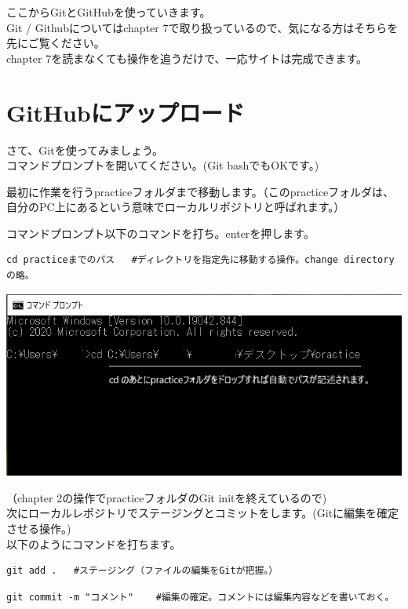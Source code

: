 \documentclass[
]{book}
\begin{document}
ここからGitとGitHubを使っていきます。\\
Git / Githubについてはchapter 7で取り扱っているので、気になる方はそちらを先にご覧ください。\\
chapter 7を読まなくても操作を追うだけで、一応サイトは完成できます。

\hypertarget{githubux306bux30a2ux30c3ux30d7ux30edux30fcux30c9}{%
\section{GitHubにアップロード}\label{githubux306bux30a2ux30c3ux30d7ux30edux30fcux30c9}}

さて、Gitを使ってみましょう。\\
コマンドプロンプトを開いてください。(Git bashでもOKです。)

最初に作業を行うpracticeフォルダまで移動します。（このpracticeフォルダは、自分のPC上にあるという意味でローカルリポジトリと呼ばれます。）

コマンドプロンプト以下のコマンドを打ち。enterを押します。

\begin{verbatim}
cd practiceまでのパス   #ディレクトリを指定先に移動する操作。change directoryの略。
\end{verbatim}

\includegraphics{pics/cd.png}

（chapter 2の操作でpracticeフォルダのGit initを終えているので)\\
次にローカルレポジトリでステージングとコミットをします。(Gitに編集を確定させる操作。)\\
以下のようにコマンドを打ちます。

\begin{verbatim}
git add .   #ステージング（ファイルの編集をGitが把握。）
\end{verbatim}

\begin{verbatim}
git commit -m "コメント"    #編集の確定。コメントには編集内容などを書いておく。
\end{verbatim}
\end{document}
